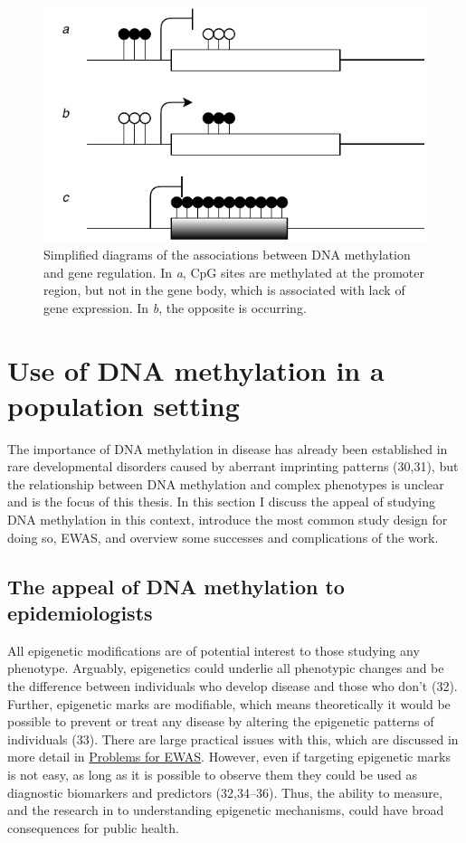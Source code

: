 \documentclass[11pt,twoside]{bristolthesis}
\begin{document}
\begin{figure}
\centering
\includegraphics{figure/01-introduction/dnam-gene-expression.pdf}
\caption{\label{fig:dnam-functions}Simplified diagrams of the associations between DNA methylation and gene regulation. In \emph{a}, CpG sites are methylated at the promoter region, but not in the gene body, which is associated with lack of gene expression. In \emph{b}, the opposite is occurring.}
\end{figure}
\hypertarget{dnam-phs}{%
\section{Use of DNA methylation in a population setting~}\label{dnam-phs}}

The importance of DNA methylation in disease has already been established in rare developmental disorders caused by aberrant imprinting patterns (30,31), but the relationship between DNA methylation and complex phenotypes is unclear and is the focus of this thesis. In this section I discuss the appeal of studying DNA methylation in this context, introduce the most common study design for doing so, EWAS, and overview some successes and complications of the work.

\hypertarget{appeal-of-dnam}{%
\subsection{The appeal of DNA methylation to epidemiologists}\label{appeal-of-dnam}}

All epigenetic modifications are of potential interest to those studying any phenotype. Arguably, epigenetics could underlie all phenotypic changes and be the difference between individuals who develop disease and those who don't (32). Further, epigenetic marks are modifiable, which means theoretically it would be possible to prevent or treat any disease by altering the epigenetic patterns of individuals (33). There are large practical issues with this, which are discussed in more detail in \protect\hyperlink{problems-for-ewas}{Problems for EWAS}. However, even if targeting epigenetic marks is not easy, as long as it is possible to observe them they could be used as diagnostic biomarkers and predictors (32,34--36). Thus, the ability to measure, and the research in to understanding epigenetic mechanisms, could have broad consequences for public health.
\end{document}
